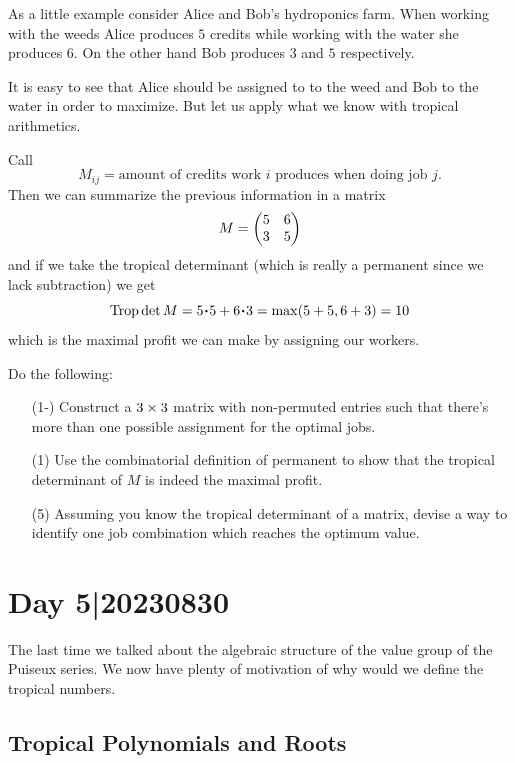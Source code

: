 \documentclass[12pt]{memoir}
\DeclareMathOperator{\Trop}{Trop}
\begin{document}
\begin{Ex}
    As a little example consider Alice and Bob's hydroponics farm. When working with the weeds Alice produces $5$ credits while working with the water she produces $6$. On the other hand Bob produces $3$ and $5$ respectively.\par 
    It is easy to see that Alice should be assigned to to the weed and Bob to the water in order to maximize. But let us apply what we know with tropical arithmetics.\par 
    Call 
    $$M_{ij}=\text{amount of credits work }i\text{ produces when doing job }j.$$
    Then we can summarize the previous information in a matrix 
    $$M=\begin{pmatrix} 5 & 6 \\ 3 & 5 \end{pmatrix}$$
    and if we take the tropical determinant (which is really a permanent since we lack subtraction) we get
    $$\Trop\det M=5\.5+6\.3=\max(5+5,6+3)=10$$
    which is the maximal profit we can make by assigning our workers.
\end{Ex}

\begin{Ej}
    Do the following:
    \begin{itemize}
        \item[(1-)] Construct a $3\times3$ matrix with non-permuted entries such that there's more than one possible assignment for the optimal jobs.
        \item[(1)] Use the combinatorial definition of permanent to show that the tropical determinant of $M$ is indeed the maximal profit. 
        \item[(5)] Assuming you know the tropical determinant of a matrix, devise a way to identify one job combination which reaches the optimum value. 
    \end{itemize}
\end{Ej}

\section{Day 5|20230830}

The last time we talked about the algebraic structure of the value group of the Puiseux series. We now have plenty of motivation of why would we define the tropical numbers. 

\subsection{Tropical Polynomials and Roots}
\end{document}
